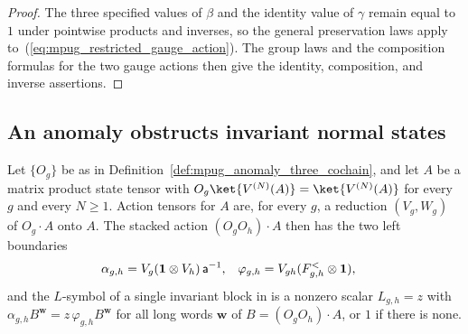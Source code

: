 \begin{proof}\leanok
    The three specified values of $\beta$ and the identity value of $\gamma$
    remain equal to $1$ under pointwise products and inverses, so the general
    preservation laws apply to~(\ref{eq:mpug_restricted_gauge_action}).
    The group laws and the composition formulas for the two gauge actions then
    give the identity, composition, and inverse assertions.
\end{proof}

\subsection{An anomaly obstructs invariant normal states}

\begin{definition}
    \label{def:mpug_single_block_l_symbol}
    \leanok
    Let $\{O_g\}$ be as in Definition~\ref{def:mpug_anomaly_three_cochain},
    and let $A$ be a matrix product state tensor with
    $O_g\ket{V^{(N)}(A)}=\ket{V^{(N)}(A)}$ for every $g$ and every $N\geq1$.
    Action tensors for $A$ are, for every $g$, a reduction $(V_g,W_g)$ of
    $O_g\cdot A$ onto $A$. The stacked action $(O_gO_h)\cdot A$ then has the
    two left boundaries
    \begin{align}
        \alpha_{g,h}  & =V_g(\mathbf 1\otimes V_h)\,\mathsf a^{-1}, &
        \varphi_{g,h} & =V_{gh}(F^<_{g,h}\otimes\mathbf 1),
        \notag
    \end{align}
    and the $L$-symbol of a single invariant block in
    \cite{FrancoRubio2025MPUGauging} is a nonzero scalar $L_{g,h}=z$ with
    $\alpha_{g,h}B^{\mathbf w}=z\,\varphi_{g,h}B^{\mathbf w}$ for all long
    words $\mathbf w$ of $B=(O_gO_h)\cdot A$, or $1$ if there is none.
\end{definition}


